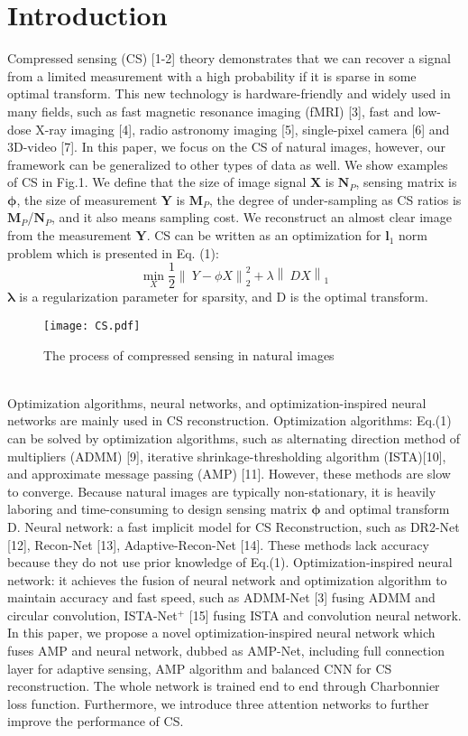 \documentclass[conference]{IEEEtran}
\begin{document}
\section{Introduction}
Compressed sensing (CS) [1-2] theory demonstrates that we can recover a signal from a limited measurement with a high probability if it is sparse in some optimal transform. This new technology is hardware-friendly and widely used in many fields, such as fast magnetic resonance imaging (fMRI) [3], fast and low-dose X-ray imaging [4], radio astronomy imaging [5], single-pixel camera [6] and 3D-video [7]. In this paper, we focus on the CS of natural images, however, our framework can be generalized to other types of data as well.
We show examples of CS in Fig.1. We define that the size of image signal $\bm{X}$ is $\bm{N}_P$, sensing matrix is $\bm{\phi}$, the size of measurement $\bm{Y}$ is $\bm{M}_P$, the degree of under-sampling as CS ratios is $\bm{M}_P$/$\bm{N}_P$, and it also means sampling cost. We reconstruct an almost clear image from the measurement $\bm{Y}$. CS can be written as an optimization for $\bm{l}_1$ norm problem which is presented in Eq. (1):
 \begin{equation}
 \min_{X}\frac{1}{2}\left \| \ Y-\phi X \right \|_{2}^{2}+\lambda\left \| \ D X \right \|_{1}
\end{equation}
 $\bm{\lambda}$ is a regularization parameter for sparsity, and D is the optimal transform. 
\begin{figure}[h]
\centering
\texttt{[image: CS.pdf]} \caption{The process of compressed sensing in natural images}
\label{fig:CS} \end{figure}
\\Optimization algorithms, neural networks, and optimization-inspired neural networks are mainly used in CS reconstruction. Optimization algorithms: Eq.(1) can be solved by optimization algorithms, such as alternating direction method of multipliers (ADMM) [9], iterative shrinkage-thresholding algorithm (ISTA)[10], and approximate message passing (AMP) [11]. However, these methods are slow to converge. Because natural images are typically non-stationary, it is heavily laboring and time-consuming to design sensing matrix  $\bm{\phi}$ and optimal transform D. Neural network: a fast implicit model for CS Reconstruction, such as DR2-Net [12], Recon-Net [13], Adaptive-Recon-Net [14]. These methods lack accuracy because they do not use prior knowledge of Eq.(1). Optimization-inspired neural network: it achieves the fusion of neural network and optimization algorithm to maintain accuracy and fast speed, such as ADMM-Net [3] fusing ADMM and circular convolution, ISTA-Net$^{+}$ [15] fusing ISTA and convolution neural network. In this paper, we propose a novel optimization-inspired neural network which fuses AMP and neural network, dubbed as AMP-Net, including full connection layer for adaptive sensing, AMP algorithm  and balanced CNN for CS reconstruction. The whole network is trained end to end through Charbonnier loss function. Furthermore, we introduce three attention networks to further improve the performance of CS. 
\end{document}
